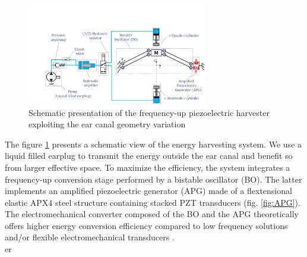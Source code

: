 \documentclass[3p,twocolumn,preprint]{elsarticle}
\begin{document}
\begin{figure}[!htbp]
	\centering
	\captionsetup{justification=centering}
	\includegraphics[trim={3.2cm 0cm 0cm 4.3cm},clip, width=0.7\textwidth]{figures/system_presentation.pdf}
	\caption{Schematic presentation of the frequency-up piezoelectric harvester exploiting the ear canal geometry variation} 
	\label{fig:system_presentation}
\end{figure}
The figure \ref{fig:system_presentation} presents a schematic view of the energy harvesting system. We use a liquid filled earplug to transmit the energy outside the ear canal and benefit so from larger effective space. To maximize the efficiency, the system integrates a frequency-up conversion stage performed by a bistable oscillator (BO). The latter implements an amplified piezoelectric generator (APG) made of a flextensional elastic APX4 steel structure containing stacked PZT transducers (fig. \ref{fig:APG}). The electromechanical converter composed of the BO and the APG theoretically offers higher energy conversion efficiency compared to low frequency solutions and/or flexible electromechanical transducers \cite{Guo2019,Peng2021,Kulah2008}.\\ er
\end{document}
